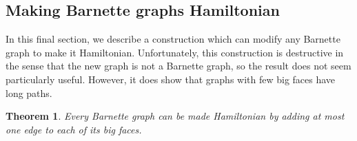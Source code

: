 \documentclass{scrartcl}
\theoremstyle{definition}
\theoremstyle{plain}
\newtheorem{theorem}{Theorem}
\begin{document}
%
%

\subsection*{Making Barnette graphs Hamiltonian}

In this final section, we describe a construction which can modify any Barnette graph to make
it Hamiltonian.
Unfortunately, this construction is destructive in the sense that the new graph is not a Barnette
graph, so the result does not seem particularly useful.
However, it does show that graphs with few big faces have long paths.

\begin{theorem}
    Every Barnette graph can be made Hamiltonian by adding at most one edge to each of its big
    faces.
\end{theorem}
\end{document}
